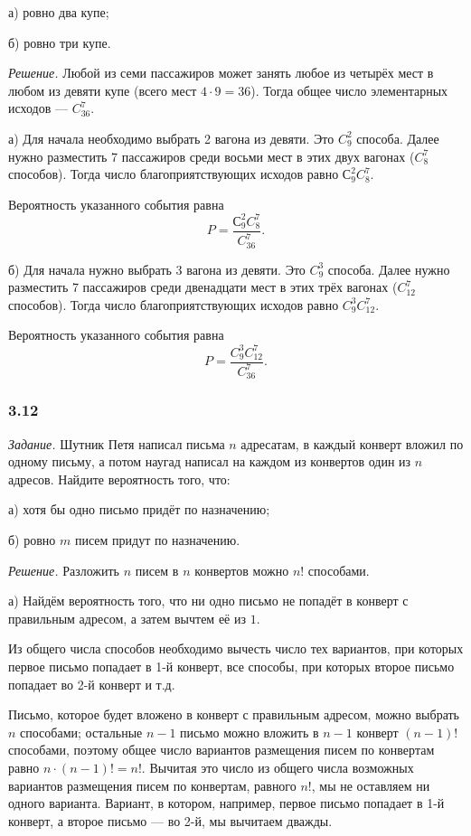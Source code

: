 \documentclass{book}
\begin{document}
а) ровно два купе;

б) ровно три купе.

\textit{Решение.}
Любой из семи пассажиров может занять любое из четырёх мест в любом из девяти купе (всего мест $4 \cdot 9 = 36$).
Тогда общее число элементарных исходов --- $C_{36}^7$.

а) Для начала необходимо выбрать 2 вагона из девяти.
Это $C_9^2$ способа.
Далее нужно разместить 7 пассажиров среди восьми мест в этих двух вагонах ($C_{8}^7$ способов).
Тогда число благоприятствующих исходов равно $С_9^2 C_8^7$.

Вероятность указанного события равна
$$P =
\frac{С_9^2 C_8^7}{C_{36}^7}.$$

б) Для начала нужно выбрать 3 вагона из девяти.
Это $C_9^3$ способа.
Далее нужно разместить 7 пассажиров среди двенадцати мест в этих трёх вагонах ($C_{12}^7$ способов).
Тогда число благоприятствующих исходов равно $C_9^3 C_{12}^7$.

Вероятность указанного события равна
$$P =
\frac{C_9^3 C_{12}^7}{C_{36}^7}.$$

\subsubsection*{3.12}

\textit{Задание.} Шутник Петя написал письма $n$ адресатам, в каждый конверт вложил по одному письму, а потом наугад написал на каждом из конвертов один из $n$ адресов.
Найдите вероятность того, что:

а) хотя бы одно письмо придёт по назначению;

б) ровно $m$ писем придут по назначению. 

\textit{Решение.} Разложить $n$ писем в $n$ конвертов можно $n!$ способами.

а) Найдём вероятность того, что ни одно письмо не попадёт в конверт с правильным адресом, а затем вычтем её из $1$.

Из общего числа способов необходимо вычесть число тех вариантов, при которых первое письмо попадает в 1-й конверт,
все способы, при которых второе письмо попадает во 2-й конверт и т.д.

Письмо, которое будет вложено в конверт с правильным адресом, можно выбрать $n$ способами;
остальные $n - 1$ письмо можно вложить в $n - 1$ конверт $ \left( n - 1 \right)!$ способами,
поэтому общее число вариантов размещения писем по конвертам равно $n \cdot \left( n - 1 \right)! = n!$.
Вычитая это число из общего числа возможных вариантов размещения писем по конвертам, равного $n!$,
мы не оставляем ни одного варианта.
Вариант, в котором, например, первое письмо попадает в 1-й конверт, а второе письмо --- во 2-й, мы вычитаем дважды.
\end{document}
